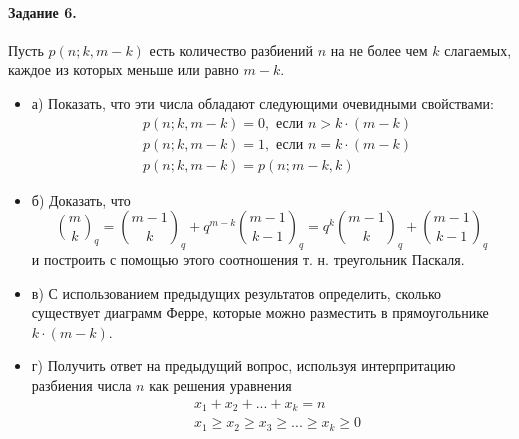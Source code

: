 \documentclass[a4paper,12pt]{article}
\begin{document}
\paragraph{Задание 6.} Пусть $p\left(n;k,m-k\right)$ есть количество разбиений $n$ на не более чем $k$ слагаемых, каждое из которых меньше или равно $m-k$.
\begin{itemize}
\item а) Показать, что эти числа обладают следующими очевидными свойствами:
\[
	\begin{split}
		&p\left(n;k,m-k\right) = 0, \text{ если } n > k\cdot \left(m-k\right) \\
		&p\left(n;k,m-k\right) = 1, \text{ если } n = k\cdot \left(m-k\right) \\
		&p\left(n;k,m-k\right) = p\left(n;m-k,k\right)
	\end{split}
\]

\item б) Доказать, что
\[
	\binom{m}{k}_q = \binom{m-1}{k}_q + q^{m-k}\binom{m-1}{k-1}_q = q^k \binom{m-1}{k}_q + \binom{m-1}{k-1}_q
\]
и построить с помощью этого соотношения т. н. треугольник Паскаля.

\item в) С использованием предыдущих результатов определить, сколько существует диаграмм Ферре, которые можно разместить в прямоугольнике $k\cdot \left(m-k\right)$.

\item г) Получить ответ на предыдущий вопрос, используя интерпритацию разбиения числа $n$ как решения уравнения
\[
	\begin{split}
		&x_1 + x_2 + ... + x_k = n \\
		&x_1 \ge x_2 \ge x_3 \ge ... \ge x_k \ge 0
	\end{split}
\]
\end{itemize}
\end{document}
